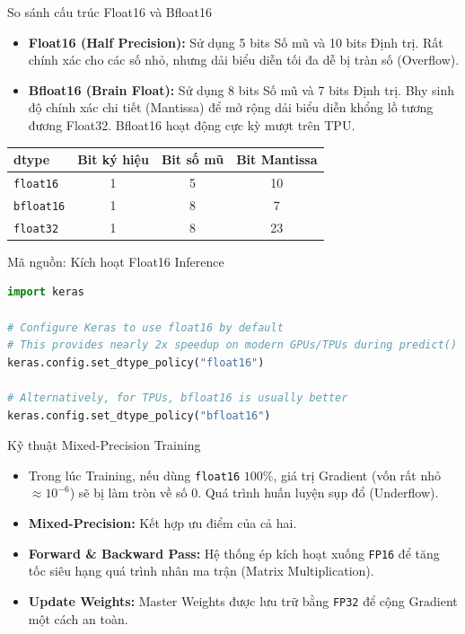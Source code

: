 \documentclass[aspectratio=169]{beamer}
\begin{document}
\begin{frame}{So sánh cấu trúc Float16 và Bfloat16}
    \begin{itemize}
        \item \textbf{Float16 (Half Precision):} Sử dụng 5 bits Số mũ và 10 bits Định trị. Rất chính xác cho các số nhỏ, nhưng dải biểu diễn tối đa dễ bị tràn số (Overflow).
        \item \textbf{Bfloat16 (Brain Float):} Sử dụng 8 bits Số mũ và 7 bits Định trị. Bhy sinh độ chính xác chi tiết (Mantissa) để mở rộng dải biểu diễn khổng lồ tương đương Float32. Bfloat16 hoạt động cực kỳ mượt trên TPU.
    \end{itemize}
    \begin{center}
    \begin{tabular}{lccc}
        \toprule
        \textbf{dtype} & \textbf{Bit ký hiệu} & \textbf{Bit số mũ} & \textbf{Bit Mantissa} \\
        \midrule
        \texttt{float16} & 1 & 5 & 10 \\
        \texttt{bfloat16} & 1 & 8 & 7 \\
        \texttt{float32} & 1 & 8 & 23 \\
        \bottomrule
    \end{tabular}
    \end{center}
\end{frame}

\begin{frame}[fragile]{Mã nguồn: Kích hoạt Float16 Inference}
\begin{lstlisting}[language=Python]
import keras

# Configure Keras to use float16 by default
# This provides nearly 2x speedup on modern GPUs/TPUs during predict()
keras.config.set_dtype_policy("float16")

# Alternatively, for TPUs, bfloat16 is usually better
keras.config.set_dtype_policy("bfloat16")
\end{lstlisting}
\end{frame}

\begin{frame}{Kỹ thuật Mixed-Precision Training}
    \begin{itemize}
        \item Trong lúc Training, nếu dùng \texttt{float16} $100\%$, giá trị Gradient (vốn rất nhỏ $\approx 10^{-6}$) sẽ bị làm tròn về số 0. Quá trình huấn luyện sụp đổ (Underflow).
        \item \textbf{Mixed-Precision:} Kết hợp ưu điểm của cả hai.
        \item \textbf{Forward \& Backward Pass:} Hệ thống ép kích hoạt xuống \texttt{FP16} để tăng tốc siêu hạng quá trình nhân ma trận (Matrix Multiplication).
        \item \textbf{Update Weights:} Master Weights được lưu trữ bằng \texttt{FP32} để cộng Gradient một cách an toàn.
    \end{itemize}
\end{frame}
\end{document}
